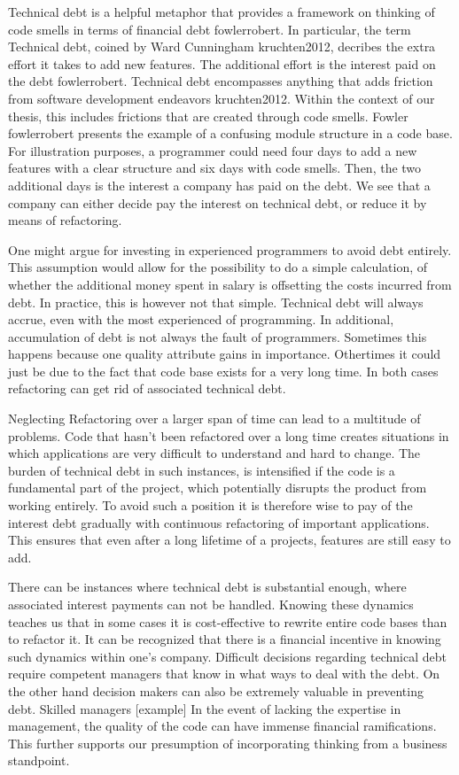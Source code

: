 Technical debt is a helpful metaphor 
	that provides a framework on thinking of code smells 
	in terms of financial debt {fowlerrobert}.
In particular, the term Technical debt, coined by Ward Cunningham {kruchten2012}, decribes the extra effort it takes to add new features. 
The additional effort is the interest paid on the debt {fowlerrobert}. 
Technical debt encompasses anything 
	that adds friction from software development endeavors {kruchten2012}. 
Within the context of our thesis,
	this includes frictions that are created through code smells. 
Fowler {fowlerrobert} presents the example 
	of a confusing module structure in a code base.
For illustration purposes, 
	a programmer could need four days to add a new features 
	with a clear structure and six days with code smells. 
Then, the two additional days is the interest a company has paid on the debt.
We see that a company can either decide pay the interest on technical debt, 
	or reduce it by means of refactoring. 

One might argue for investing in experienced programmers to avoid debt entirely. 
This assumption would allow for the possibility 
	to do a simple calculation, 
	of whether the additional money spent in salary 
	is offsetting the costs incurred from debt.
In practice, this is however not that simple.
Technical debt will always accrue, 
	even with the most experienced of programming.
In additional, accumulation of debt is not always the fault of programmers.
Sometimes this happens because one quality attribute gains in importance. 
Othertimes it could just be due to the fact 
	that code base exists for a very long time. 
In both cases refactoring can get rid of associated technical debt. 

Neglecting Refactoring over a larger span of time can lead to a multitude of problems. Code that hasn't been refactored over a long time creates situations in which applications are very difficult to understand and hard to change.
The burden of technical debt in such instances, is intensified if the code is a fundamental part of the project, which potentially disrupts the product from working entirely.
To avoid such a position it is therefore wise to pay of the interest debt gradually with continuous refactoring of important applications. This ensures that even after a long lifetime of a projects, features are still easy to add.

There can be instances where technical debt is substantial enough, 
	where associated interest payments can not be handled. 
Knowing these dynamics teaches us 
	that in some cases it is cost-effective to 
	rewrite entire code bases than to refactor it.  
It can be recognized that there is a financial incentive in 
	knowing such dynamics within one's company.
Difficult decisions regarding technical debt require 
	competent managers that know in what ways to deal with the debt. 
On the other hand decision makers can 
	also be extremely valuable in preventing debt. 
Skilled managers [example]
In the event of lacking the expertise in management, 
	the quality of the code can have immense financial ramifications. 
This further supports our presumption of 
	incorporating thinking from a business standpoint.

